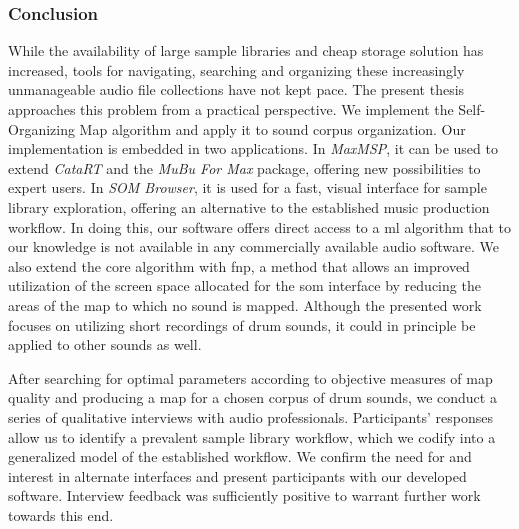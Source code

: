 \subsubsection{Conclusion}
\label{subsubsec:discussion_conclusion}
While the availability of large sample libraries and cheap storage solution has
increased, tools for navigating, searching and organizing these increasingly
unmanageable audio file collections have not kept pace.
The present thesis approaches this problem from a practical perspective. We
implement the Self-Organizing Map algorithm and apply it
to sound corpus organization. Our implementation is embedded in two
applications. In \textit{MaxMSP}, it can be used to extend \textit{CataRT} and
the \textit{MuBu For Max} package, offering new possibilities to expert users.
In \textit{SOM Browser}, it is used for a fast, visual interface for sample
library exploration, offering an alternative to the established music production
workflow. In doing this, our software offers direct access to a \gls{ml}
algorithm that to our knowledge is not available in any commercially
available audio software. We also extend the core algorithm with \gls{fnp}, a
method that allows an improved utilization of the screen space allocated for the
\gls{som} interface by reducing the areas of the map to which no sound is
mapped. Although the presented work focuses on utilizing short recordings of
drum sounds, it could in principle be applied to other sounds as well.

\smallskip


After searching for optimal parameters according to objective measures of map
quality and producing a map for a chosen corpus of drum sounds, we conduct a
series of qualitative interviews with audio professionals. Participants'
responses allow us to identify a prevalent sample library workflow, which we
codify into a generalized model of the established workflow. We confirm the need
for and interest in alternate interfaces and present participants with our
developed software. Interview feedback was sufficiently positive to warrant
further work towards this end.
